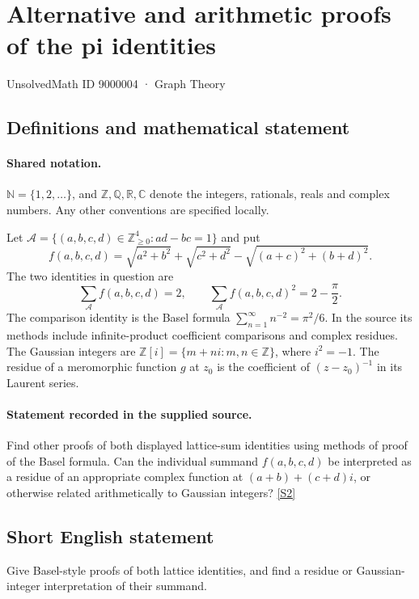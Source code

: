 \documentclass[11pt]{article}
\newcommand{\sref}[2]{\hyperlink{source:#1:#2}{[S#2]}}
\begin{document}
\setcounter{section}{9000003}
\section{Alternative and arithmetic proofs of the pi identities}\label{9000004}
{\small\sffamily UnsolvedMath ID 9000004 · Graph Theory}
\subsection{Definitions and mathematical statement}

\paragraph{Shared notation.}$\mathbb N=\{1,2,\ldots\}$, and $\mathbb Z,\mathbb Q,\mathbb R,\mathbb C$ denote the integers, rationals, reals and complex numbers. Any other conventions are specified locally.


Let $\mathcal A=\{(a,b,c,d)\in\mathbb Z_{\ge0}^{4}:ad-bc=1\}$ and put
\[
f(a,b,c,d)=\sqrt{a^2+b^2}+\sqrt{c^2+d^2}-\sqrt{(a+c)^2+(b+d)^2}.
\]
The two identities in question are
\[
\sum_{\mathcal A}f(a,b,c,d)=2,\qquad
\sum_{\mathcal A}f(a,b,c,d)^2=2-\frac\pi2.
\]
The comparison identity is the Basel formula $\sum_{n=1}^{\infty}n^{-2}=\pi^2/6$. In the source its methods include infinite-product coefficient comparisons and complex residues. The Gaussian integers are $\mathbb Z[i]=\{m+ni:m,n\in\mathbb Z\}$, where $i^2=-1$. The residue of a meromorphic function $g$ at $z_0$ is the coefficient of $(z-z_0)^{-1}$ in its Laurent series.
\paragraph{Statement recorded in the supplied source.}
Find other proofs of both displayed lattice-sum identities using methods of proof of the Basel formula. Can the individual summand $f(a,b,c,d)$ be interpreted as a residue of an appropriate complex function at $(a+b)+(c+d)i$, or otherwise related arithmetically to Gaussian integers? \sref{9000004}{2}
\subsection{Short English statement}
Give Basel-style proofs of both lattice identities, and find a residue or Gaussian-integer interpretation of their summand.
\end{document}
